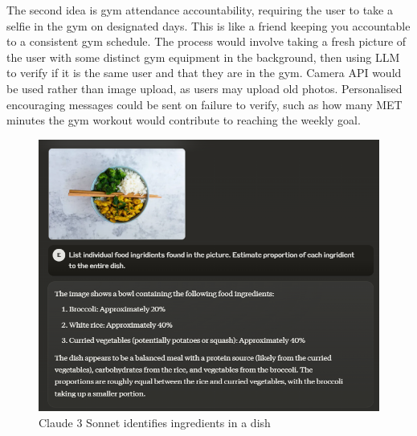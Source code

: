 The second idea is gym attendance accountability, requiring the user to take a selfie in the gym on designated days. This is like a friend keeping you accountable to a consistent gym schedule. The process would involve taking a fresh picture of the user with some distinct gym equipment in the background, then using LLM to verify if it is the same user and that they are in the gym. Camera API would be used rather than image upload, as users may upload old photos. Personalised encouraging messages could be sent on failure to verify, such as how many MET minutes the gym workout would contribute to reaching the weekly goal. 
\begin{figure}
    
    \centering
    \includegraphics[width=1\textwidth,keepaspectratio]{../images/sonnet_vision.png}
    \caption{Claude 3 Sonnet identifies ingredients in a dish}
    \label{fig:sonnetV1}
    
\end{figure}

